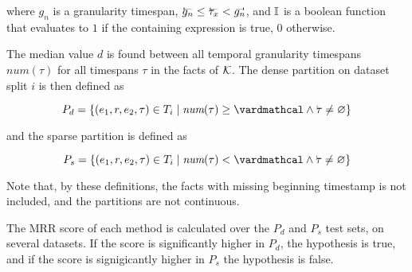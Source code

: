 where $g_n$ is a granularity timespan, $\timebegin{g_n} \leq \timebegin{\tau_x} < \timeend{g_n}$, and $\mathbb{I}$ is a boolean function that evaluates to $1$ if the containing expression is true, $0$ otherwise.

The median value $d$ is found between all temporal granularity timespans $\mathit{num}(\tau)$ for all timespans $\tau$ in the facts of $\mathcal{K}$. The dense partition on dataset split $i$ is then defined as

\begin{equation}
P_d = \{ (e_1, r, e_2, \tau) \in \test_i \mid \textit{num}(\tau) \geq \vard \wedge \timebegin{\tau} \neq \varmiss \}
\end{equation}

\noindent
and the sparse partition is defined as 

\begin{equation}
P_s = \{ (e_1, r, e_2, \tau) \in \test_i \mid \textit{num}(\tau) < \vard \wedge \timebegin{\tau} \neq \varmiss \}
\end{equation}

Note that, by these definitions, the facts with missing beginning timestamp is not included, and the partitions are not continuous.

The MRR score of each method is calculated over the $P_d$ and $P_s$ test sets, on several datasets. If the score is significantly higher in $P_d$, the hypothesis is true, and if the score is signigicantly higher in $P_s$ the hypothesis is false.
